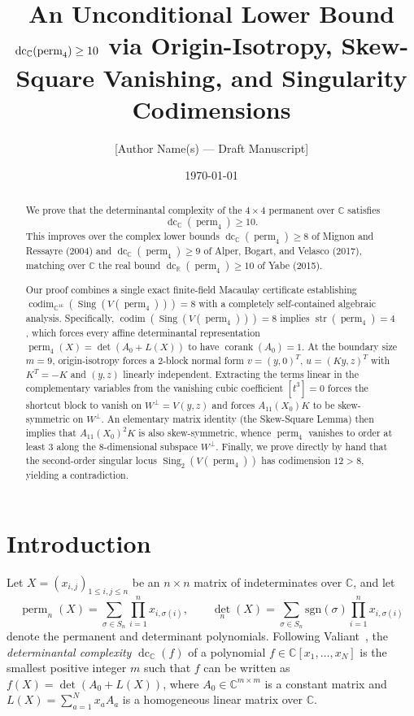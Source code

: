 \documentclass[11pt,a4paper]{article}
\title{An Unconditional Lower Bound $\dc_{\mathbb{C}}(\perm_4) \ge 10$ via Origin-Isotropy, Skew-Square Vanishing, and Singularity Codimensions}
\author{[Author Name(s) --- Draft Manuscript]}
\date{\today}
\theoremstyle{definition}
\DeclareMathOperator{\perm}{perm}
\DeclareMathOperator{\dc}{dc}
\DeclareMathOperator{\codim}{codim}
\DeclareMathOperator{\Sing}{Sing}
\DeclareMathOperator{\corank}{corank}
\DeclareMathOperator{\str}{str}
\begin{document}
\maketitle

\begin{abstract}
We prove that the determinantal complexity of the $4 \times 4$ permanent over $\mathbb{C}$ satisfies
\[
  \dc_{\mathbb{C}}(\perm_4) \ge 10.
\]
This improves over the complex lower bounds $\dc_{\mathbb{C}}(\perm_4) \ge 8$ of Mignon and Ressayre (2004) and $\dc_{\mathbb{C}}(\perm_4) \ge 9$ of Alper, Bogart, and Velasco (2017), matching over $\mathbb{C}$ the real bound $\dc_{\mathbb{R}}(\perm_4) \ge 10$ of Yabe (2015).

Our proof combines a single exact finite-field Macaulay certificate establishing $\codim_{\mathbb{C}^{16}}(\Sing(V(\perm_4))) = 8$ with a completely self-contained algebraic analysis. Specifically, $\codim(\Sing(V(\perm_4))) = 8$ implies $\str(\perm_4) = 4$, which forces every affine determinantal representation $\perm_4(X) = \det(A_0 + L(X))$ to have $\corank(A_0) = 1$. At the boundary size $m = 9$, origin-isotropy forces a $2$-block normal form $v = (y, 0)^T$, $u = (Ky, z)^T$ with $K^T = -K$ and $(y,z)$ linearly independent. Extracting the terms linear in the complementary variables from the vanishing cubic coefficient $[t^3] = 0$ forces the shortcut block to vanish on $W^\perp = V(y,z)$ and forces $A_{11}(X_0)K$ to be skew-symmetric on $W^\perp$. An elementary matrix identity (the Skew-Square Lemma) then implies that $A_{11}(X_0)^2 K$ is also skew-symmetric, whence $\perm_4$ vanishes to order at least $3$ along the $8$-dimensional subspace $W^\perp$. Finally, we prove directly by hand that the second-order singular locus $\Sing_2(V(\perm_4))$ has codimension $12 > 8$, yielding a contradiction.
\end{abstract}

\section{Introduction}

Let $X = (x_{i,j})_{1 \le i,j \le n}$ be an $n \times n$ matrix of indeterminates over $\mathbb{C}$, and let
\[
  \perm_n(X) = \sum_{\sigma \in S_n} \prod_{i=1}^n x_{i,\sigma(i)}, \qquad
  \det_n(X) = \sum_{\sigma \in S_n} \mathrm{sgn}(\sigma) \prod_{i=1}^n x_{i,\sigma(i)}
\]
denote the permanent and determinant polynomials. Following Valiant~\cite{Valiant1979}, the \emph{determinantal complexity} $\dc_{\mathbb{C}}(f)$ of a polynomial $f \in \mathbb{C}[x_1,\dots,x_N]$ is the smallest positive integer $m$ such that $f$ can be written as $f(X) = \det(A_0 + L(X))$, where $A_0 \in \mathbb{C}^{m\times m}$ is a constant matrix and $L(X) = \sum_{a=1}^N x_a A_a$ is a homogeneous linear matrix over $\mathbb{C}$.
\end{document}

